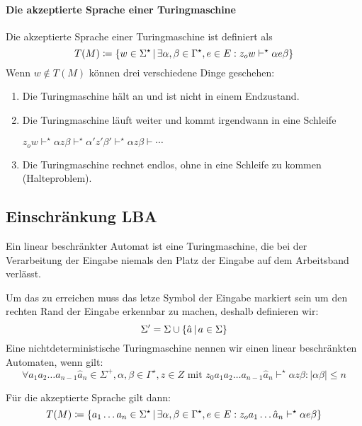 \paragraph{Die akzeptierte Sprache einer Turingmaschine}
Die akzeptierte Sprache einer Turingmaschine ist definiert als
\begin{equation*}
	T(M)\coloneqq\left\{ w\in\Sigma^\star \,\middle|\, \exists \alpha,\beta\in\Gamma^\star, e\in E: z_ow\vdash^\star \alpha e\beta \right\}
\end{equation*}
Wenn $w\not\in T(M)$ können drei verschiedene Dinge geschehen:
\begin{enumerate}
	\item Die Turingmaschine hält an und ist nicht in einem Endzustand.
	\item Die Turingmaschine läuft weiter und kommt irgendwann in eine Schleife

	$z_ow\vdash^\star \alpha z\beta\vdash^\star\alpha'z'\beta'\vdash^\star\alpha z\beta\vdash\cdots$
	\item Die Turingmaschine rechnet endlos, ohne in eine Schleife zu kommen (Halteproblem).
\end{enumerate}

\subsection{Einschränkung LBA}
Ein linear beschränkter Automat ist eine Turingmaschine, die bei der Verarbeitung der Eingabe niemals den Platz der Eingabe auf dem Arbeitsband verlässt.

Um das zu erreichen muss das letze Symbol der Eingabe markiert sein um den rechten Rand der Eingabe erkennbar zu machen, deshalb definieren wir:
\begin{equation*}
	\Sigma'=\Sigma\cup\left\{ \hat a \,\middle|\, a\in\Sigma \right\}
\end{equation*}
Eine nichtdeterministische Turingmaschine nennen wir einen linear beschränkten Automaten, wenn gilt:
\begin{equation*}
	\forall a_1a_2\ldots a_{n-1}\hat a_n\in\Sigma^+, \alpha,\beta\in\Gamma^\star, z\in Z \text{ mit } z_0a_1a_2\ldots a_{n-1}\hat a_n\vdash^\star \alpha z \beta : |\alpha\beta|\leq n
\end{equation*}

Für die akzeptierte Sprache gilt dann:
\begin{equation*}
	T(M)\coloneqq\left\{ a_1\ldots a_n\in\Sigma^\star \,\middle|\, \exists \alpha,\beta\in\Gamma^\star, e\in E: z_oa_1\ldots\hat a_n\vdash^\star \alpha e\beta \right\}
\end{equation*}

